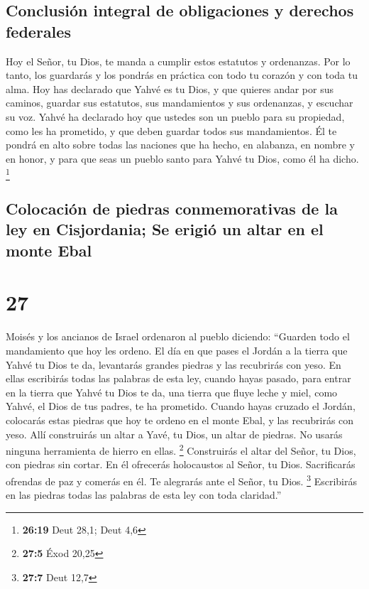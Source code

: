 \hypertarget{conclusiuxf3n-integral-de-obligaciones-y-derechos-federales}{%
\subsection{Conclusión integral de obligaciones y derechos
federales}\label{conclusiuxf3n-integral-de-obligaciones-y-derechos-federales}}

 Hoy el Señor, tu Dios, te manda a cumplir estos
estatutos y ordenanzas. Por lo tanto, los guardarás y los pondrás en
práctica con todo tu corazón y con toda tu alma.  Hoy has
declarado que Yahvé es tu Dios, y que quieres andar por sus caminos,
guardar sus estatutos, sus mandamientos y sus ordenanzas, y escuchar su
voz.  Yahvé ha declarado hoy que ustedes son un pueblo
para su propiedad, como les ha prometido, y que deben guardar todos sus
mandamientos.  Él te pondrá en alto sobre todas las
naciones que ha hecho, en alabanza, en nombre y en honor, y para que
seas un pueblo santo para Yahvé tu Dios, como él ha dicho. \footnote{\textbf{26:19}
  Deut 28,1; Deut 4,6}

\hypertarget{colocaciuxf3n-de-piedras-conmemorativas-de-la-ley-en-cisjordania-se-erigiuxf3-un-altar-en-el-monte-ebal}{%
\subsection{Colocación de piedras conmemorativas de la ley en
Cisjordania; Se erigió un altar en el monte
Ebal}\label{colocaciuxf3n-de-piedras-conmemorativas-de-la-ley-en-cisjordania-se-erigiuxf3-un-altar-en-el-monte-ebal}}

\hypertarget{section-26}{%
\section{27}\label{section-26}}

 Moisés y los ancianos de Israel ordenaron al pueblo
diciendo: ``Guarden todo el mandamiento que hoy les ordeno.
 El día en que pases el Jordán a la tierra que Yahvé tu
Dios te da, levantarás grandes piedras y las recubrirás con yeso.
 En ellas escribirás todas las palabras de esta ley,
cuando hayas pasado, para entrar en la tierra que Yahvé tu Dios te da,
una tierra que fluye leche y miel, como Yahvé, el Dios de tus padres, te
ha prometido.  Cuando hayas cruzado el Jordán, colocarás
estas piedras que hoy te ordeno en el monte Ebal, y las recubrirás con
yeso.  Allí construirás un altar a Yavé, tu Dios, un altar
de piedras. No usarás ninguna herramienta de hierro en ellas.
\footnote{\textbf{27:5} Éxod 20,25}  Construirás el altar
del Señor, tu Dios, con piedras sin cortar. En él ofrecerás holocaustos
al Señor, tu Dios.  Sacrificarás ofrendas de paz y comerás
en él. Te alegrarás ante el Señor, tu Dios. \footnote{\textbf{27:7} Deut
  12,7}  Escribirás en las piedras todas las palabras de
esta ley con toda claridad.''

